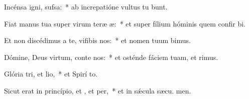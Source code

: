 \item Incénsa igni,  sufsa:~* ab increpatióne vultus tu bunt.
\item Fiat manus tua super virum teræ æ:~* et super fílium hóminis quem confir bi.
\item Et non discédimus a te, vifibis nos:~* et nomen tuum bimus.
\item Dómine, Deus virtum, conte nos:~* et osténde fáciem tuam, et  rimus.
\item Glória tri, et lio,~* et Spirí to.
\item Sicut erat in princípio, et , et per,~* et in sǽcula sæcu. men.
